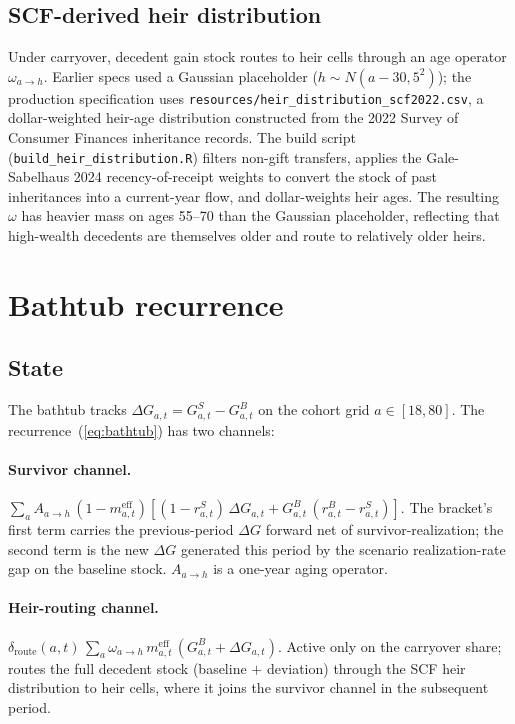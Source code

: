 \documentclass[11pt]{article}
\begin{document}
\subsection{SCF-derived heir distribution}

Under carryover, decedent gain stock routes to heir cells through an age
operator $\omega_{a \to h}$. Earlier specs used a Gaussian placeholder
($h \sim N(a - 30, 5^2)$); the production specification uses
\texttt{resources/heir\_distribution\_scf2022.csv}, a dollar-weighted
heir-age distribution constructed from the 2022 Survey of Consumer Finances
inheritance records. The build script (\texttt{build\_heir\_distribution.R})
filters non-gift transfers, applies the Gale-Sabelhaus 2024 recency-of-receipt
weights to convert the stock of past inheritances into a current-year flow,
and dollar-weights heir ages. The resulting $\omega$ has heavier mass on
ages 55--70 than the Gaussian placeholder, reflecting that high-wealth
decedents are themselves older and route to relatively older heirs.

\section{Bathtub recurrence}
\label{app:bathtub}

\subsection{State}

The bathtub tracks $\Delta G_{a,t} = G^S_{a,t} - G^B_{a,t}$ on the cohort
grid $a \in [18, 80]$. The recurrence~(\ref{eq:bathtub}) has two channels:

\paragraph{Survivor channel.}
$\sum_a A_{a \to h}\,(1 - m^{\text{eff}}_{a,t})
   \left[(1 - r^S_{a,t})\,\Delta G_{a,t}
         + G^B_{a,t}\,(r^B_{a,t} - r^S_{a,t})\right]$.
The bracket's first term carries the previous-period $\Delta G$ forward net
of survivor-realization; the second term is the new $\Delta G$ generated
this period by the scenario realization-rate gap on the baseline stock.
$A_{a \to h}$ is a one-year aging operator.

\paragraph{Heir-routing channel.}
$\delta_{\text{route}}(a, t)\,\sum_a \omega_{a \to h}\,m^{\text{eff}}_{a,t}
   \,(G^B_{a,t} + \Delta G_{a,t})$.
Active only on the carryover share; routes the full decedent stock (baseline
$+$ deviation) through the SCF heir distribution to heir cells, where it
joins the survivor channel in the subsequent period.
\end{document}
